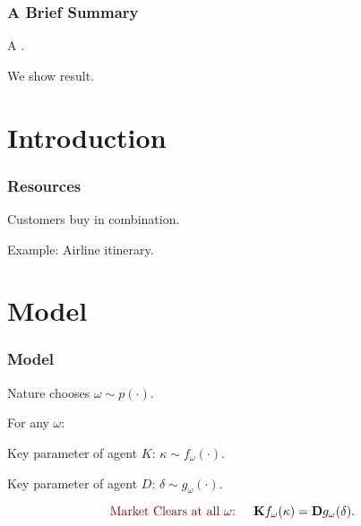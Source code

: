 \documentclass[10pt, mathserif, aspectratio = 169]{beamer}
\begin{document}


\begin{frame}

\frametitle{A Brief Summary}

A . \pause \vspace{2em}

We show  result.

\end{frame}


\section{Introduction}

\begin{frame}
\frametitle{Resources}
Customers buy  in combination.

\pause \vspace{2em}

Example: Airline itinerary.

\end{frame}


\section{Model}

\begin{frame}
\frametitle{Model}
Nature chooses $\omega \sim p(\cdot)$.\pause\vspace{2em}

For any $\omega$:\pause\vspace{2em}

Key parameter of agent $K$: $\kappa \sim  f_\omega(\cdot)$. \pause\vspace{2em}

Key parameter of agent $D$: $\delta \sim g_\omega(\cdot)$. \pause\vspace{2em}

\begin{equation*}
\text{\callout{Market Clears at all $\omega$:} } \quad \mathbf{K} f_\omega(\kappa) = \mathbf{D} g_\omega(\delta).
\end{equation*}

\end{frame}
\end{document}

